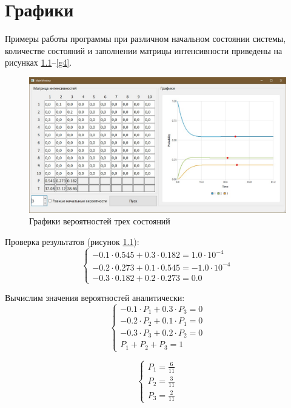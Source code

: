 \chapter{Графики}
Примеры работы программы при различном начальном состоянии системы, количестве состояний и заполнении матрицы интенсивности приведены на рисунках \ref{g1}--\ref{g4}.

\begin{figure}[h]
	\includegraphics[width=1\linewidth]{inc/img/g1}
	\caption{Графики вероятностей трех состояний}
	\label{g1}
\end{figure}

Проверка результатов (рисунок \ref{g1}):
\begin{equation}
	\left\{\begin{array}{l}
		-0.1 \cdot 0.545 + 0.3\cdot0.182 = 1.0\cdot10^{-4} \\
		-0.2 \cdot 0.273 + 0.1\cdot0.545 = -1.0\cdot10^{-4} \\
		-0.3 \cdot 0.182 + 0.2\cdot0.273 = 0.0
	\end{array}\right.
\label{eq1}
\end{equation}

Вычислим значения вероятностей аналитически:
\begin{equation}
	\left\{\begin{array}{l}
		-0.1 \cdot P_1 + 0.3 \cdot P_3 = 0 \\
		-0.2 \cdot P_2 + 0.1 \cdot P_1 = 0 \\
		-0.3 \cdot P_3 + 0.2 \cdot P_2 = 0 \\
		P_1 + P_2 + P_3 = 1
	\end{array}\right.
	\label{eq2}
\end{equation}

\begin{equation*}
	\left\{\begin{array}{l}
		P_1 = \frac{6}{11} \\
		P_2 = \frac{3}{11} \\
		P_3  = \frac{2}{11}
	\end{array}\right.
\end{equation*}

